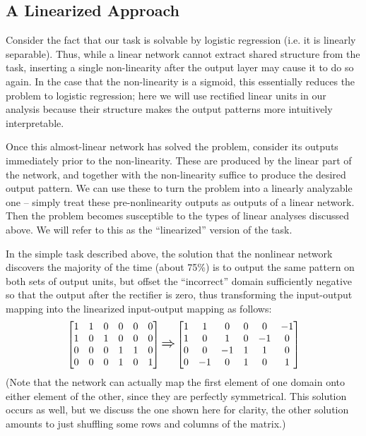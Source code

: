 \documentclass[10pt,letterpaper]{article}
\begin{document}
\subsection{A Linearized Approach}
Consider the fact that our task is solvable by logistic regression (i.e. it is linearly separable). Thus, while a linear network cannot extract shared structure from the task, inserting a single non-linearity after the output layer may cause it to do so again. In the case that the non-linearity is a sigmoid, this essentially reduces the problem to logistic regression; here we will use rectified linear units in our analysis because their structure makes the output patterns more intuitively interpretable. \par 
Once this almost-linear network has solved the problem, consider its outputs immediately prior to the non-linearity. These are produced by the linear part of the network, and together with the non-linearity suffice to produce the desired output pattern. We can use these to turn the problem into a linearly analyzable one -- simply treat these pre-nonlinearity outputs as outputs of a linear network. Then the problem becomes susceptible to the types of linear analyses discussed above. We will refer to this as the ``linearized'' version of the task. \par 
In the simple task described above, the solution that the nonlinear network discovers the majority of the time (about 75\%) is to output the same pattern on both sets of output units, but offset the ``incorrect'' domain sufficiently negative so that the output after the rectifier is zero, thus transforming the input-output mapping into the linearized input-output mapping as follows:
\[
\left[ \begin{matrix} 
1 & 1 & 0 & 0 & 0 & 0 \\
1 & 0 & 1 & 0 & 0 & 0 \\
 0 & 0 & 0 & 1 & 1 & 0\\
 0 & 0 & 0 & 1 & 0 & 1\\
\end{matrix}  \right] 
\mathlarger{\mathlarger{\Rightarrow}}
\left[ \begin{matrix} 
1 & 1 & 0 & 0 & 0 & -1 \\
1 & 0 & 1 & 0 & -1 & 0 \\
 0 & 0 & -1 & 1 & 1 & 0\\
 0 & -1 & 0 & 1 & 0 & 1\\
\end{matrix}  \right] 
\] 
(Note that the network can actually map the first element of one domain onto either element of the other, since they are perfectly symmetrical. This solution occurs as well, but we discuss the one shown here for clarity, the other solution amounts to just shuffling some rows and columns of the matrix.)\par
\end{document}
